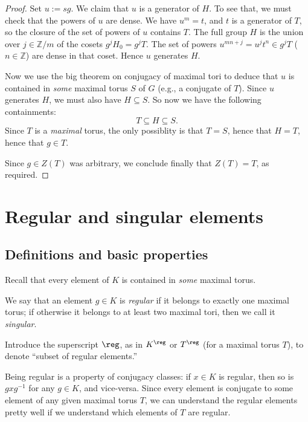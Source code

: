 \documentclass[reqno]{amsart} 
\begin{document}
\begin{proof}
  Set $u := s g$.  We claim that $u$ is a generator of $H$.  To see that, we must check that the powers of $u$ are dense.  We have $u^m = t$, and $t$ is a generator of $T$, so the closure of the set of powers of $u$ contains $T$.  The full group $H$ is the union over $j \in \mathbb{Z}/m$ of the cosets $g^j H_0 = g^j T$.  The set of powers $u^{m n + j} = u^j t^n \in g^j T$ ($n \in \mathbb{Z}$) are dense in that coset.  Hence $u$ generates $H$.

  Now we use the big theorem on conjugacy of maximal tori to deduce that $u$ is contained in \emph{some} maximal torus $S$ of $G$ (e.g., a conjugate of $T$).  Since $u$ generates $H$, we must also have $H \subseteq S$.  So now we have the following containments:
  \begin{equation*}
    T \subseteq H \subseteq S.
  \end{equation*}
  Since $T$ is a \emph{maximal} torus, the only possiblity is that $T = S$, hence that $H = T$, hence that $g \in T$.

  Since $g \in Z(T)$ was arbitrary, we conclude finally that $Z(T) = T$, as required.
\end{proof}

\section{Regular and singular elements}
\label{sec:orgf4996f8}
\subsection{Definitions and basic properties}
\label{sec:orgedf2662}
Recall that every element of $K$ is contained in \emph{some} maximal torus.
\begin{definition}
  We say that an element $g \in K$ is \emph{regular} if it belongs to exactly one maximal torus; if otherwise it belongs to at least two maximal tori, then we call it \emph{singular}.
\end{definition}
Introduce the superscript $\reg$, as in $K^{\reg}$ or $T^{\reg}$ (for a maximal torus $T$), to denote ``subset of regular elements.''

Being regular is a property of conjugacy classes: if $x \in K$ is regular, then so is $g x g^{-1}$ for any $g \in K$, and vice-versa.  Since every element is conjugate to some element of any given maximal torus $T$, we can understand the regular elements pretty well if we understand which elements of $T$ are regular.
\end{document}
